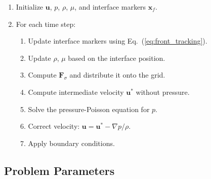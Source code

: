 \documentclass[12pt]{article}
\begin{document}
\begin{enumerate}
    \item Initialize $\mathbf{u}$, $p$, $\rho$, $\mu$, and interface markers $\mathbf{x}_f$.
    \item For each time step:
    \begin{enumerate}
        \item Update interface markers using Eq.~(\ref{eq:front_tracking}).
        \item Update $\rho$, $\mu$ based on the interface position.
        \item Compute $\mathbf{F}_\sigma$ and distribute it onto the grid.
        \item Compute intermediate velocity $\mathbf{u}^*$ without pressure.
        \item Solve the pressure-Poisson equation for $p$.
        \item Correct velocity: $\mathbf{u} = \mathbf{u}^* - \nabla p / \rho$.
        \item Apply boundary conditions.
    \end{enumerate}
\end{enumerate}



\subsection{Problem Parameters}
\end{document}
